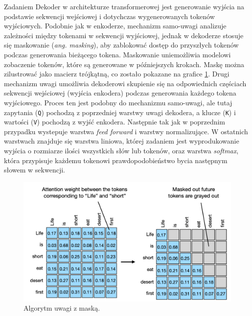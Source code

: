 \documentclass[data-science]{agh-wi} %
\begin{document}
Zadaniem Dekoder w architekturze transformerowej jest generowanie wyjścia na podstawie sekwencji wejściowej i dotychczas wygenerowanych tokenów wyjściowych. Podobnie jak w enkoderze, mechanizm samo-uwagi analizuje zależności między tokenami w sekwencji wyjściowej, jednak w dekoderze stosuje się maskowanie (\textit{ang. masking}), aby zablokować dostęp do przyszłych tokenów podczas generowania bieżącego tokena. Maskowanie uniemożliwia modelowi zobaczenie tokenów, które są generowane w późniejszych krokach. Maskę można zilustrować jako macierz trójkątną, co zostało pokazane na grafice \ref*{fig:masked_attention}. Drugi mechanizm uwagi umożliwia dekoderowi skupienie się na odpowiednich częściach sekwencji wejściowej (wyjścia enkodera) podczas generowania każdego tokena wyjściowego. Proces ten jest podobny do mechanizmu samo-uwagi, ale tutaj zapytania (\texttt{Q}) pochodzą z poprzedniej warstwy uwagi dekodera, a klucze (\texttt{K}) i wartości (\texttt{V}) pochodzą z wyjść enkodera. Następnie tak jak w poprzednim przypadku wystepuje warstwa \textit{feed forward} i warstwy normalizujące. W ostatnich warstwach znajduje się warstwa liniowa, której zadaniem jest wyprodukowanie wyjścia o rozmiarze ilości wszystkich słów lub tokenów, oraz warstwa \textit{softmax}, która przypisuje każdemu tokenowi prawdopodobieństwo bycia następnym słowem w sekwencji.

\begin{figure}[ht!]
    \begin{center}
        \includegraphics[width=0.9\linewidth]{./img/masked_Att.jpg}
    \end{center}
    \caption{Algorytm uwagi z maską.}\label{fig:masked_attention}
\end{figure}

\end{document}
